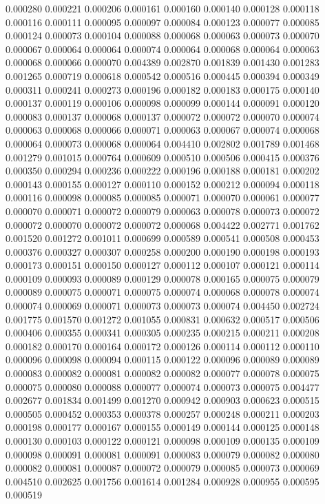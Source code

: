 0.000280
0.000221
0.000206
0.000161
0.000160
0.000140
0.000128
0.000118
0.000116
0.000111
0.000095
0.000097
0.000084
0.000123
0.000077
0.000085
0.000124
0.000073
0.000104
0.000088
0.000068
0.000063
0.000073
0.000070
0.000067
0.000064
0.000064
0.000074
0.000064
0.000068
0.000064
0.000063
0.000068
0.000066
0.000070
0.004389
0.002870
0.001839
0.001430
0.001283
0.001265
0.000719
0.000618
0.000542
0.000516
0.000445
0.000394
0.000349
0.000311
0.000241
0.000273
0.000196
0.000182
0.000183
0.000175
0.000140
0.000137
0.000119
0.000106
0.000098
0.000099
0.000144
0.000091
0.000120
0.000083
0.000137
0.000068
0.000137
0.000072
0.000072
0.000070
0.000074
0.000063
0.000068
0.000066
0.000071
0.000063
0.000067
0.000074
0.000068
0.000064
0.000073
0.000068
0.000064
0.004410
0.002802
0.001789
0.001468
0.001279
0.001015
0.000764
0.000609
0.000510
0.000506
0.000415
0.000376
0.000350
0.000294
0.000236
0.000222
0.000196
0.000188
0.000181
0.000202
0.000143
0.000155
0.000127
0.000110
0.000152
0.000212
0.000094
0.000118
0.000116
0.000098
0.000085
0.000085
0.000071
0.000070
0.000061
0.000077
0.000070
0.000071
0.000072
0.000079
0.000063
0.000078
0.000073
0.000072
0.000072
0.000070
0.000072
0.000072
0.000068
0.004422
0.002771
0.001762
0.001520
0.001272
0.001011
0.000699
0.000589
0.000541
0.000508
0.000453
0.000376
0.000327
0.000307
0.000258
0.000200
0.000190
0.000198
0.000193
0.000173
0.000151
0.000150
0.000127
0.000112
0.000107
0.000121
0.000114
0.000109
0.000093
0.000089
0.000129
0.000078
0.000165
0.000075
0.000079
0.000089
0.000075
0.000071
0.000075
0.000074
0.000068
0.000078
0.000074
0.000074
0.000069
0.000071
0.000073
0.000073
0.000074
0.004450
0.002724
0.001775
0.001570
0.001272
0.001055
0.000831
0.000632
0.000517
0.000506
0.000406
0.000355
0.000341
0.000305
0.000235
0.000215
0.000211
0.000208
0.000182
0.000170
0.000164
0.000172
0.000126
0.000114
0.000112
0.000110
0.000096
0.000098
0.000094
0.000115
0.000122
0.000096
0.000089
0.000089
0.000083
0.000082
0.000081
0.000082
0.000082
0.000077
0.000078
0.000075
0.000075
0.000080
0.000088
0.000077
0.000074
0.000073
0.000075
0.004477
0.002677
0.001834
0.001499
0.001270
0.000942
0.000903
0.000623
0.000515
0.000505
0.000452
0.000353
0.000378
0.000257
0.000248
0.000211
0.000203
0.000198
0.000177
0.000167
0.000155
0.000149
0.000144
0.000125
0.000148
0.000130
0.000103
0.000122
0.000121
0.000098
0.000109
0.000135
0.000109
0.000098
0.000091
0.000081
0.000091
0.000083
0.000079
0.000082
0.000080
0.000082
0.000081
0.000087
0.000072
0.000079
0.000085
0.000073
0.000069
0.004510
0.002625
0.001756
0.001614
0.001284
0.000928
0.000955
0.000595
0.000519
